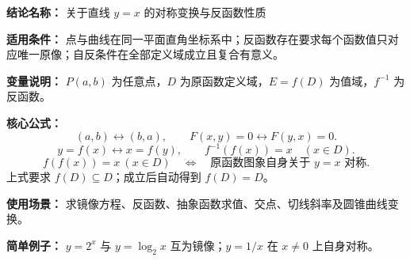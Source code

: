 \textbf{结论名称：} 关于直线 $y=x$ 的对称变换与反函数性质

\textbf{适用条件：} 点与曲线在同一平面直角坐标系中；反函数存在要求每个函数值只对应唯一原像；自反条件在全部定义域成立且复合有意义。

\textbf{变量说明：} $P(a,b)$ 为任意点，$D$ 为原函数定义域，$E=f(D)$ 为值域，$f^{-1}$ 为反函数。

\textbf{核心公式：}
\[
\boxed{(a,b)\longleftrightarrow(b,a)},\qquad
\boxed{F(x,y)=0\longleftrightarrow F(y,x)=0}.
\]
\[
 y=f(x)\longleftrightarrow x=f(y),\qquad
 f^{-1}(f(x))=x\quad(x\in D).
\]
\[
 \boxed{f(f(x))=x\ (x\in D)}
 \quad\Longleftrightarrow\quad
 \text{原函数图象自身关于 $y=x$ 对称}.
\]
上式要求 $f(D)\subseteq D$；成立后自动得到 $f(D)=D$。

\textbf{使用场景：} 求镜像方程、反函数、抽象函数求值、交点、切线斜率及圆锥曲线变换。

\textbf{简单例子：} $y=2^x$ 与 $y=\log_2 x$ 互为镜像；$y=1/x$ 在 $x\ne0$ 上自身对称。

